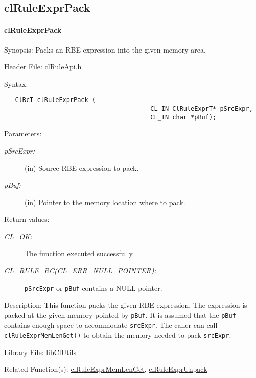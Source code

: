 \begin{flushleft}
\subsection{clRuleExprPack}
\hypertarget{pagerule118}{}\paragraph{cl\-Rule\-Expr\-Pack}\label{pagerule118}
\begin{Desc}
\item[Synopsis:]Packs an RBE expression into the given memory area.\end{Desc}
\begin{Desc}
\item[Header File:]clRuleApi.h\end{Desc}
\begin{Desc}
\item[Syntax:]

\footnotesize\begin{verbatim}   ClRcT clRuleExprPack (
                              			CL_IN ClRuleExprT* pSrcExpr,
                              			CL_IN char *pBuf);
\end{verbatim}
\normalsize
\end{Desc}
\begin{Desc}
\item[Parameters:]
\begin{description}
\item[{\em p\-Src\-Expr:}](in) Source RBE expression to pack. \item[{\em p\-Buf:}](in) Pointer to the memory location where to pack.\end{description}
\end{Desc}
\begin{Desc}
\item[Return values:]
\begin{description}
\item[{\em CL\_\-OK:}]The function executed successfully. 
\item[{\em CL\_\-RULE\_\-RC(CL\_\-ERR\_\-NULL\_\-POINTER):}]{\tt{pSrcExpr}} or {\tt{pBuf}} contains a NULL pointer.\end{description}
\end{Desc}
\begin{Desc}
\item[Description:]This function packs the given RBE expression. The expression is packed at the given memory pointed by {\tt{p\-Buf}}. It is assumed
that the {\tt{p\-Buf}} contains enough space to accommodate {\tt{src\-Expr}}. The caller can call {\tt{clRuleExprMemLenGet()}} to obtain the memory
needed to pack {\tt{src\-Expr}}.\end{Desc}
\begin{Desc}
\item[Library File:]lib\-Cl\-Utils\end{Desc}
\begin{Desc}
\item[Related Function(s):]\hyperlink{pagerule117}{cl\-Rule\-Expr\-Mem\-Len\-Get}, \hyperlink{pagerule119}{cl\-Rule\-Expr\-Unpack} \end{Desc}
\newpage



\end{flushleft}

